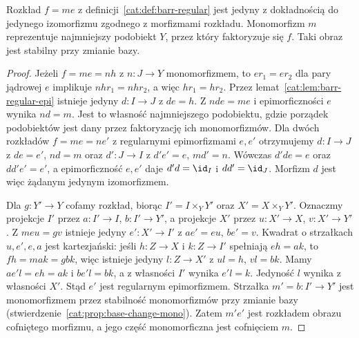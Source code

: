 \begin{twierdzenie}\label{cat:thm:barr-image}
Rozkład $f=me$ z definicji~\ref{cat:def:barr-regular} jest jedyny z dokładnością do jedynego izomorfizmu zgodnego z morfizmami rozkładu. Monomorfizm $m$ reprezentuje najmniejszy podobiekt $Y$, przez który faktoryzuje się $f$. Taki obraz jest stabilny przy zmianie bazy.
\end{twierdzenie}
\begin{proof}
Jeżeli $f=me=nh$ z $n:J\to Y$ monomorfizmem, to $e r_1=e r_2$ dla pary jądrowej $e$ implikuje $nh r_1=nh r_2$, a więc $h r_1=h r_2$. Przez lemat~\ref{cat:lem:barr-regular-epi} istnieje jedyny $d:I\to J$ z $de=h$. Z $nde=me$ i epimorficzności $e$ wynika $nd=m$. Jest to własność najmniejszego podobiektu, gdzie porządek podobiektów jest dany przez faktoryzację ich monomorfizmów. Dla dwóch rozkładów $f=me=ne'$ z regularnymi epimorfizmami $e,e'$ otrzymujemy $d:I\to J$ z $de=e'$, $nd=m$ oraz $d':J\to I$ z $d'e'=e$, $md'=n$. Wówczas $d'de=e$ oraz $dd'e'=e'$, a epimorficzność $e,e'$ daje $d'd=\id_I$ i $dd'=\id_J$. Morfizm $d$ jest więc żądanym jedynym izomorfizmem. 

Dla $g:Y'\to Y$ cofamy rozkład, biorąc $I'=I\times_Y Y'$ oraz $X'=X\times_Y Y'$. Oznaczmy projekcje $I'$ przez $a:I'\to I$, $b:I'\to Y'$, a projekcje $X'$ przez $u:X'\to X$, $v:X'\to Y'$. Z $meu=gv$ istnieje jedyny $e':X'\to I'$ z $ae'=eu$, $be'=v$. Kwadrat o strzałkach $u,e',e,a$ jest kartezjański: jeśli $h:Z\to X$ i $k:Z\to I'$ spełniają $eh=ak$, to $fh=mak=gbk$, więc istnieje jedyny $l:Z\to X'$ z $ul=h$, $vl=bk$. Mamy $ae'l=eh=ak$ i $be'l=bk$, a z własności $I'$ wynika $e'l=k$. Jedyność $l$ wynika z własności $X'$. Stąd $e'$ jest regularnym epimorfizmem. Strzałka $m'=b:I'\to Y'$ jest monomorfizmem przez stabilność monomorfizmów przy zmianie bazy (stwierdzenie~\ref{cat:prop:base-change-mono}). Zatem $m'e'$ jest rozkładem obrazu cofniętego morfizmu, a jego część monomorficzna jest cofnięciem $m$.
\end{proof}

